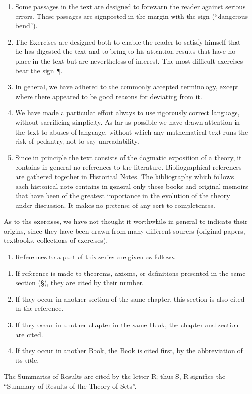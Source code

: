 \begin{enumerate}
\def\labelenumi{\arabic{enumi}.}
\setcounter{enumi}{5}
\item
  Some passages in the text are designed to forewarn the reader against serious errors. These passages are signposted in the margin with the sign (``dangerous bend'').
\item
  The Exercises are designed both to enable the reader to satisfy himself that he has digested the text and to bring to his attention results that have no place in the text but are nevertheless of interest. The most difficult exercises bear the sign ¶.
\item
  In general, we have adhered to the commonly accepted terminology, except where there appeared to be good reasons for deviating from it.
\item
  We have made a particular effort always to use rigorously correct language, without sacrificing simplicity. As far as possible we have drawn attention in the text to abuses of language, without which any mathematical text runs the risk of pedantry, not to say unreadability.
\item
  Since in principle the text consists of the dogmatic exposition of a theory, it contains in general no references to the literature. Bibliographical references are gathered together in Historical Notes. The bibliography which follows each historical note contains in general only those books and original memoirs that have been of the greatest importance in the evolution of the theory under discussion. It makes no pretense of any sort to completeness.
\end{enumerate}

As to the exercises, we have not thought it worthwhile in general to indicate their origins, since they have been drawn from many different sources (original papers, textbooks, collections of exercises).

\begin{enumerate}
\def\labelenumi{\arabic{enumi}.}
\setcounter{enumi}{10}
\tightlist
\item
  References to a part of this series are given as follows:
\end{enumerate}

\begin{enumerate}
\def\labelenumi{\alph{enumi})}
\item
  If reference is made to theorems, axioms, or definitions presented in the same section (§), they are cited by their number.
\item
  If they occur in another section of the same chapter, this section is also cited in the reference.
\item
  If they occur in another chapter in the same Book, the chapter and section are cited.
\item
  If they occur in another Book, the Book is cited first, by the abbreviation of its title.
\end{enumerate}

The Summaries of Results are cited by the letter R; thus S, R signifies the ``Summary of Results of the Theory of Sets''.

